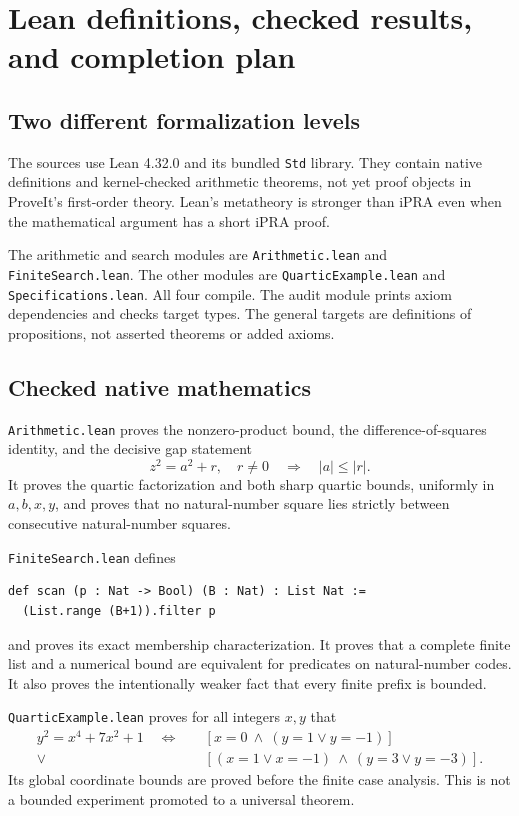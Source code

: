 \section{Lean definitions, checked results, and completion plan}
\label{sec:lean}

\subsection{Two different formalization levels}

The sources use Lean 4.32.0 and its bundled \texttt{Std} library.
They contain native definitions and kernel-checked arithmetic theorems,
not yet proof objects in ProveIt's first-order theory. Lean's metatheory
is stronger than iPRA even when the mathematical argument has a short
iPRA proof.

The arithmetic and search modules are \texttt{Arithmetic.lean} and
\texttt{FiniteSearch.lean}. The other modules are
\texttt{QuarticExample.lean} and \texttt{Specifications.lean}.
All four compile.
The audit module prints axiom dependencies and checks target types.
The general targets are definitions of propositions, not asserted
theorems or added axioms.

\subsection{Checked native mathematics}

\texttt{Arithmetic.lean} proves the nonzero-product bound, the
difference-of-squares identity, and the decisive gap statement
\[
 z^2=a^2+r,\quad r\ne0\quad\Longrightarrow\quad |a|\le|r|.
\]
It proves the quartic factorization and both sharp quartic bounds,
uniformly in $a,b,x,y$, and proves that no natural-number square lies
strictly between consecutive natural-number squares.

\texttt{FiniteSearch.lean} defines
\begin{lstlisting}
def scan (p : Nat -> Bool) (B : Nat) : List Nat :=
  (List.range (B+1)).filter p
\end{lstlisting}
and proves its exact membership characterization. It proves that a
complete finite list and a numerical bound are equivalent for predicates
on natural-number codes. It also proves the intentionally weaker
fact that every finite prefix is bounded.

\texttt{QuarticExample.lean} proves for all integers $x,y$ that
\[
\begin{split}
y^2=x^4+7x^2+1\quad\Longleftrightarrow\quad
&[x=0\ \wedge\ (y=1\vee y=-1)]\\
{}\vee{}&[(x=1\vee x=-1)\ \wedge\ (y=3\vee y=-3)].
\end{split}
\]
Its global coordinate bounds are proved before the finite case analysis.
This is not a bounded experiment promoted to a universal theorem.

